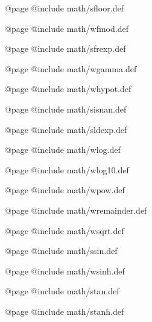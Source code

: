 @page
@include math/sfloor.def

@page
@include math/wfmod.def

@page
@include math/sfrexp.def

@page
@include math/wgamma.def

@page
@include math/whypot.def

@page
@include math/sisnan.def

@page
@include math/sldexp.def

@page
@include math/wlog.def

@page
@include math/wlog10.def

@page
@include math/wpow.def

@page
@include math/wremainder.def

@page
@include math/wsqrt.def

@page
@include math/ssin.def

@page
@include math/wsinh.def

@page
@include math/stan.def

@page
@include math/stanh.def
